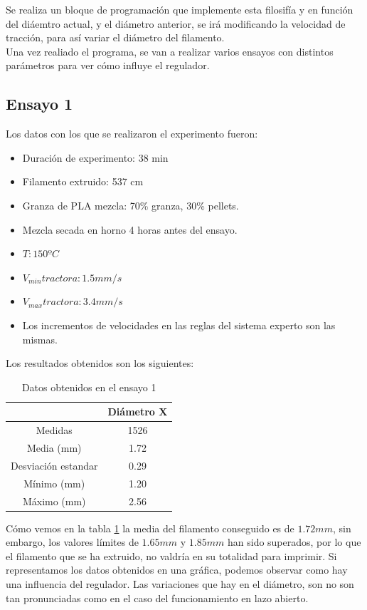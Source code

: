 Se realiza un bloque de programación que implemente esta filosifía y en función del diáemtro actual, y el diámetro anterior, se irá modificando la velocidad de tracción, para así variar el diámetro del filamento.\\

Una vez realiado el programa, se van a realizar varios ensayos con distintos parámetros para ver cómo influye el regulador.

\subsection{Ensayo 1}

Los datos con los que se realizaron el experimento fueron:

\begin{itemize}
	\item{Duración de experimento: 38 min}
	\item{Filamento extruido: 537 cm}
	\item{Granza de PLA mezcla: 70\% granza, 30\% pellets.}
	\item{Mezcla secada en horno 4 horas antes del ensayo.}
	\item{$T: 150ºC$}
	\item{$V_{min} tractora: 1.5 mm/s$}
	\item{$V_{max} tractora: 3.4 mm/s$}
	\item{Los incrementos de velocidades en las reglas del sistema experto son las mismas.}
\end{itemize}

Los resultados obtenidos son los siguientes:

\begin{table}[H]
	\centering
	\begin{tabular}{cc}
		                    & Diámetro X \\ \hline
		Medidas             & 1526       \\
		Media (mm)          & 1.72       \\
		Desviación estandar & 0.29       \\
		Mínimo (mm)         & 1.20       \\
		Máximo (mm)         & 2.56      
	\end{tabular}
	\caption{Datos obtenidos en el ensayo 1}
	\label{tab:resl_ens1}
\end{table}

Cómo vemos en la tabla \ref{tab:resl_ens1} la media del filamento conseguido es de $1.72 mm$, sin embargo, los valores límites de $1.65 mm$ y $1.85 mm$ han sido superados, por lo que el filamento que se ha extruido, no valdría en su totalidad para imprimir. Si representamos los datos obtenidos en una gráfica, podemos observar como hay una influencia del regulador. Las variaciones que hay en el diámetro, son no son tan pronunciadas como en el caso del funcionamiento en lazo abierto. \\

